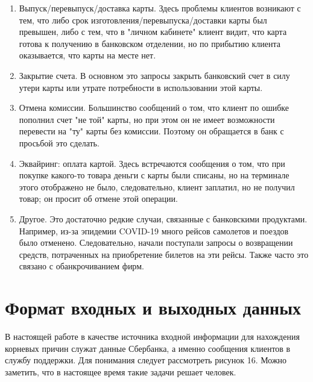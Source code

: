 \documentclass[a4paper,12pt,preview]{report} %
\begin{document}
	\begin{enumerate}
		\item Выпуск/перевыпуск/доставка карты. Здесь проблемы клиентов возникают с тем, что либо срок изготовления/перевыпуска/доставки карты был превышен, либо с тем, что в "личном кабинете" клиент видит, что карта готова к получению в банковском отделении, но по прибытию клиента оказывается, что карты на месте нет.
		
		\item Закрытие счета. В основном это запросы закрыть банковский счет в силу утери карты или утрате потребности в использовании этой карты.
		
		\item Отмена комиссии. Большинство сообщений о том, что клиент по ошибке пополнил счет "не той" карты, но при этом он не имеет возможности перевести на "ту" карты без комиссии. Поэтому он обращается в банк с просьбой это сделать.
		
		\item Эквайринг: оплата картой. Здесь встречаются сообщения о том, что при покупке какого-то товара деньги с карты были списаны, но на терминале этого отображено не было, следовательно, клиент заплатил, но не получил товар; он просит об отмене этой операции. 
		
		\item Другое. Это достаточно редкие случаи, связанные с банковскими продуктами. Например, из-за эпидемии COVID-19 много рейсов самолетов и поездов было отменено. Следовательно, начали поступали запросы о возвращении средств, потраченных на приобретение билетов на эти рейсы. Также часто это связано с обанкрочиванием фирм.
		
	\end{enumerate}
	
	\newpage
	
	\section{Формат входных и выходных данных}
	
	В настоящей работе в качестве источника входной информации для нахождения корневых причин служат данные Сбербанка, а именно сообщения клиентов в службу поддержки. Для понимания следует рассмотреть рисунок 16. Можно заметить, что в настоящее время такие задачи решает человек.
	
\end{document}

